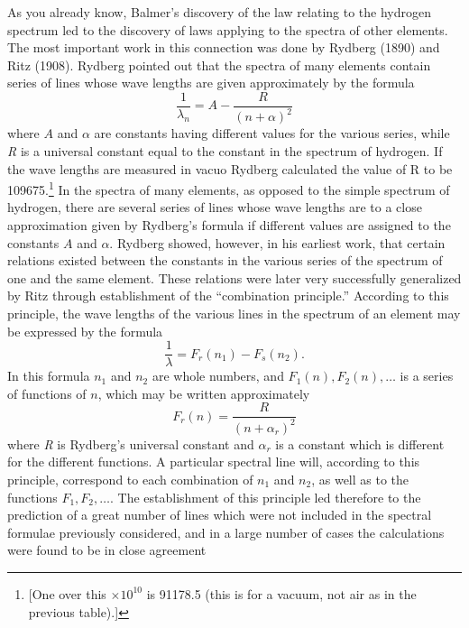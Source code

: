 As you already know, Balmer's discovery of the law relating to the
hydrogen spectrum led to the discovery of laws applying to the spectra
of other elements. The most important work in this connection was done
by Rydberg (1890) and Ritz (1908). Rydberg pointed out that the spectra
of many elements contain series of lines whose wave lengths are given
approximately by the formula
\begin{equation*}
\frac{1}{\lambda_n} = A - \frac{R}{(n + \alpha)^2}
\end{equation*}
where $A$ and $\alpha$ are constants having different values for
the various series, while \emph{R} is a universal constant equal to the
constant in the spectrum of hydrogen. If the wave lengths are measured
in vacuo Rydberg calculated the value of R to be 109675.\footnote{{[}One
  over this $\times 10^{10}$ is 91178.5 (this is for a vacuum,
  not air as in the previous table).{]}} In the spectra of many
elements, as opposed to the simple spectrum of hydrogen, there are
several series of lines whose wave lengths are to a close approximation
given by Rydberg's formula if different values are assigned to the
constants $A$ and $\alpha$. Rydberg showed, however, in his
earliest work, that certain relations existed between the constants in
the various series of the spectrum of one and the same element. These
relations were later very successfully generalized by Ritz through
establishment of the ``combination principle.'' According to this
principle, the wave lengths of the various lines in the spectrum of an
element may be expressed by the formula
%
\begin{equation}
\frac{1}{\lambda} = F_r(n_1) - F_s(n_2) .
\end{equation}
%
In this formula $n_1$ and $n_2$ are whole numbers, and
$F_1(n), F_2(n), \ldots{}$ is a series of
functions of $n$, which may be written approximately
%
\begin{equation*}
F_r(n) = \frac{R}{(n +\alpha_r)^2}
\end{equation*}
%
where \emph{R} is Rydberg's universal constant and $\alpha_r$ is a
constant which is different for the different functions. A particular
spectral line will, according to this principle, correspond to each
combination of $n_1$ and $n_2$, as well as to the functions
$F_1, F_2, \ldots{}$. The establishment of this principle led
therefore to the prediction of a great number of lines which were not
included in the spectral formulae previously considered, and in a large
number of cases the calculations were found to be in close agreement
